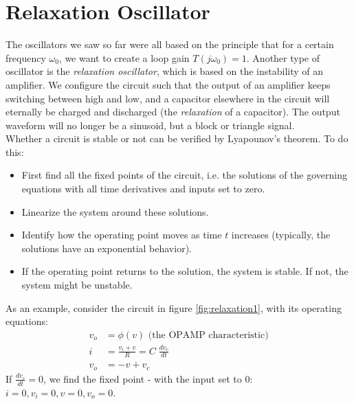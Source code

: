 \section{Relaxation Oscillator}
\label{sec:relaxation}
The oscillators we saw so far were all based on the principle that for a certain frequency $\omega_0$, we want to create a loop gain $T(j\omega_0) = 1$. Another type of oscillator is the \emph{relaxation oscillator}, which is based on the instability of an amplifier. We configure the circuit such that the output of an amplifier keeps switching between high and low, and a capacitor elsewhere in the circuit will eternally be charged and discharged (the \emph{relaxation} of a capacitor). The output waveform will no longer be a sinusoid, but a block or triangle signal.\\
Whether a circuit is stable or not can be verified by Lyapounov's theorem. To do this:
\begin{itemize}
	\item First find all the fixed points of the circuit, i.e. the solutions of the governing equations with all time derivatives and inputs set to zero.
	\item Linearize the system around these solutions.
	\item Identify how the operating point moves as time $t$ increases (typically, the solutions have an exponential behavior). %
	\item If the operating point returns to the solution, the system is stable. If not, the system might be unstable.
\end{itemize} 
As an example, consider the circuit in figure \ref{fig:relaxation1}, with its operating equations:
\begin{align*}
	v_o &= \phi(v) \text{ (the OPAMP characteristic)}\\
	i &= \frac{v_i + v}{R} = C \; \frac{dv_c}{dt} \\
	v_o &= -v + v_c
\end{align*}
If $\frac{dv_c}{dt} = 0$, we find the fixed point - with the input set to $0$: $i = 0, v_i = 0, v = 0, v_o = 0$.

